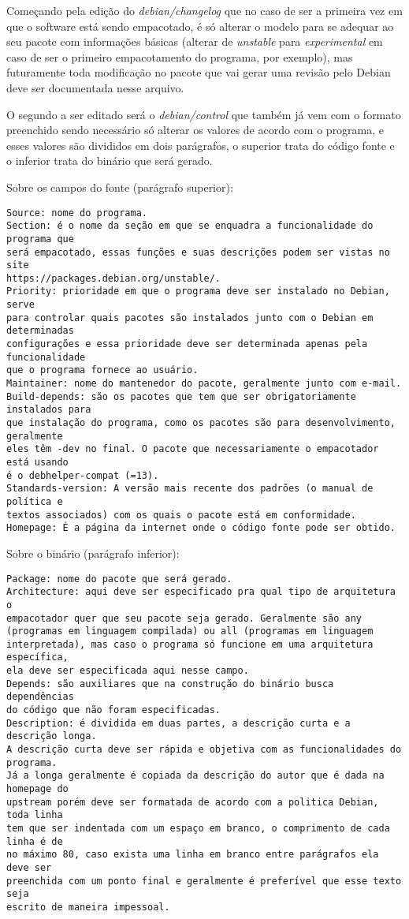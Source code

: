 Começando pela edição do \textit{debian/changelog} que no caso de ser a primeira vez em que o software está sendo empacotado, é só alterar o modelo para se adequar ao seu pacote com informações básicas (alterar de \textit{unstable} para \textit{experimental} em caso de ser o primeiro empacotamento do programa, por exemplo), mas futuramente toda modificação no pacote que vai gerar uma revisão pelo Debian deve ser documentada nesse arquivo. 

O segundo a ser editado será o \textit{debian/control} que também já vem com o formato preenchido sendo necessário só alterar os valores de acordo com o programa, e esses valores são divididos em dois parágrafos, o superior trata do código fonte e o inferior trata do binário que será gerado.

Sobre os campos do fonte (parágrafo superior):
\begin{verbatim}
Source: nome do programa.
Section: é o nome da seção em que se enquadra a funcionalidade do programa que
será empacotado, essas funções e suas descrições podem ser vistas no site 
https://packages.debian.org/unstable/.
Priority: prioridade em que o programa deve ser instalado no Debian, serve
para controlar quais pacotes são instalados junto com o Debian em determinadas 
configurações e essa prioridade deve ser determinada apenas pela funcionalidade
que o programa fornece ao usuário.
Maintainer: nome do mantenedor do pacote, geralmente junto com e-mail.
Build-depends: são os pacotes que tem que ser obrigatoriamente instalados para
que instalação do programa, como os pacotes são para desenvolvimento, geralmente
eles têm -dev no final. O pacote que necessariamente o empacotador está usando
é o debhelper-compat (=13).
Standards-version: A versão mais recente dos padrões (o manual de política e
textos associados) com os quais o pacote está em conformidade. 
Homepage: É a página da internet onde o código fonte pode ser obtido.
\end{verbatim}

Sobre o binário (parágrafo inferior):
\begin{verbatim}
Package: nome do pacote que será gerado.
Architecture: aqui deve ser especificado pra qual tipo de arquitetura o 
empacotador quer que seu pacote seja gerado. Geralmente são any 
(programas em linguagem compilada) ou all (programas em linguagem 
interpretada), mas caso o programa só funcione em uma arquitetura específica,
ela deve ser especificada aqui nesse campo.
Depends: são auxiliares que na construção do binário busca dependências
do código que não foram especificadas. 
Description: é dividida em duas partes, a descrição curta e a descrição longa.
A descrição curta deve ser rápida e objetiva com as funcionalidades do programa.
Já a longa geralmente é copiada da descrição do autor que é dada na homepage do
upstream porém deve ser formatada de acordo com a politica Debian, toda linha 
tem que ser indentada com um espaço em branco, o comprimento de cada linha é de
no máximo 80, caso exista uma linha em branco entre parágrafos ela deve ser
preenchida com um ponto final e geralmente é preferível que esse texto seja
escrito de maneira impessoal.
\end{verbatim}

